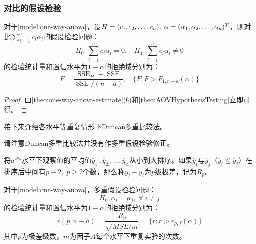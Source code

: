 \subsubsection{对比的假设检验}
\begin{theorem}
	对于\cref{model:one-way-anova}，设$H=(c_1, c_2, \dots, c_{a}),\;\alpha=(\alpha_1, \alpha_2, \dots, \alpha_{a})^T$，则对比$\sum\limits_{i=1}^{a}c_i\alpha_i$的假设检验问题：
	\begin{equation*}
		H_0:\sum_{i=1}^{a}c_i\alpha_i=0,\quad H_1:\sum_{i=1}^{a}c_i\alpha_i\ne0
	\end{equation*}
	的检验统计量和置信水平为$1-\alpha$的拒绝域分别为：
	\begin{equation*}
		F=\frac{\operatorname{SSE}_H-\operatorname{SSE}}{\operatorname{SSE}/(n-a)},\quad\{F:F>F_{1,n-a}(\alpha)\}
	\end{equation*}
\end{theorem}
\begin{proof}
	由\cref{theo:one-way-anova-estimate}(6)和\cref{theo:AOVHypothesisTesting}立即可得。
\end{proof}
接下来介绍各水平等重复情形下Duncan多重比较法。
\begin{note}
	请注意Duncan多重比较法并没有作多重假设检验修正。
\end{note}
\begin{definition}
	将$a$个水平下观察值的平均值$\overline{y}_{1.},\overline{y}_{2.},\dots,\overline{y}_{a.}$从小到大排序。如果$\overline{y}_i$与$\overline{y}_j$（$\overline{y}_i\leqslant\overline{y}_j$）在排序后中间有$p-2,\;p\geqslant2$个数，那么称$\overline{y}_j-\overline{y}_i$为$p$级极差，记为$R_p$。
\end{definition}
\begin{theorem}
	对于\cref{model:one-way-anova}，多重假设检验问题：
	\begin{equation*}
	H_0:\alpha_i=\alpha_j,\;\forall\;i\ne j
	\end{equation*}
	的检验统计量和置信水平为$1-\alpha$的拒绝域分别为：
	\begin{equation*}
		r(p,n-a)=\frac{R_p}{\sqrt{MSE/m}},\quad\{r:r>r_{p,f}(\alpha)\}
	\end{equation*}
	其中$p$为极差级数，$m$为因子$A$每个水平下重复实验的次数。
\end{theorem}
